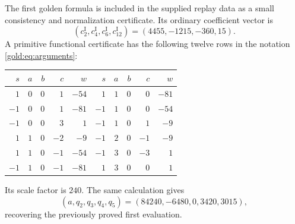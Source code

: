 The first golden formula is included in the supplied replay data as a
small consistency and normalization certificate.  Its ordinary
coefficient vector is
\[
 (c^{\mathrm I}_2,c^{\mathrm I}_4,c^{\mathrm I}_6,c^{\mathrm I}_{12})
       =(4455,-1215,-360,15).
\]
A primitive functional certificate has the following twelve rows in
the notation \eqref{gold:eq:arguments}:
\begin{center}
\small
\begin{tabular}{rrrr|r@{\qquad}rrrr|r}
$s$&$a$&$b$&$c$&$w$&$s$&$a$&$b$&$c$&$w$\\ \hline
$1$&$0$&$0$&$1$&$-54$&$1$&$1$&$0$&$0$&$-81$\\
$-1$&$0$&$0$&$1$&$-81$&$-1$&$1$&$0$&$0$&$-54$\\
$-1$&$0$&$0$&$3$&$1$&$-1$&$1$&$0$&$1$&$-9$\\
$1$&$1$&$0$&$-2$&$-9$&$-1$&$2$&$0$&$-1$&$-9$\\
$1$&$1$&$0$&$-1$&$-54$&$-1$&$3$&$0$&$-3$&$1$\\
$-1$&$1$&$0$&$-1$&$-81$&$1$&$3$&$0$&$0$&$1$
\end{tabular}
\end{center}
Its scale factor is $240$.  The same calculation gives
\[
 (a,q_2,q_3,q_4,q_5)=(84240,-6480,0,3420,3015),
\]
recovering the previously proved first evaluation.

